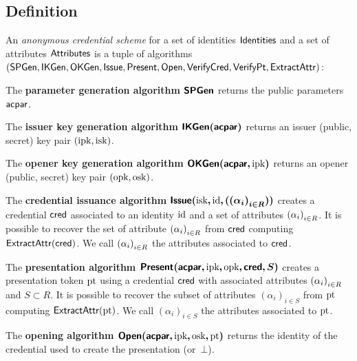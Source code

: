 \subsection{Definition}\label{sec:AC:definition}


An \textit{anonymous credential scheme} for a set of identities $\mathsf{Identities}$ and 
a set of attributes $\mathsf{Attributes}$ is a tuple of algorithms $(\mathsf{SPGen}, 
\mathsf{IKGen},\allowbreak \mathsf{OKGen}, \mathsf{Issue}, \mathsf{Present}, \mathsf{Open}, 
\mathsf{VerifyCred},\allowbreak \mathsf{VerifyPt}, \mathsf{ExtractAttr})$:

\begin{compactitem} 
\item The \textbf{parameter generation algorithm $\bm{\mathsf{SPGen}}$}
	returns the public parameters $\mathsf{acpar}$.

\item The \textbf{issuer key generation algorithm $\bm{\mathsf{IKGen}(\mathsf{acpar})}$}
returns an issuer (public, secret) key pair $(\text{ipk}, \text{isk})$.

\item The \textbf{opener key generation algorithm $\bm{\mathsf{OKGen}(\mathsf{acpar}, \text{ipk})}$}
returns an opener (public, secret) key pair $(\text{opk}, \text{osk})$.

\item The \textbf{credential issuance algorithm $\bm{\mathsf{Issue}(\text{isk}, \text{id}, 
({(\alpha_i)}_{i\in R}))}$} creates a credential $\mathsf{cred}$ associated to an identity 
$\text{id}$ and a set of attributes ${(\alpha_i)}_{i\in R}$. It is possible to recover 
the set of attribute ${(\alpha_i)}_{i\in R}$ from $\mathsf{cred}$ computing 
$\mathsf{ExtractAttr}(\mathsf{cred})$. We call ${(\alpha_i)}_{i\in R}$ the attributes associated to 
$\mathsf{cred}$.

\item The \textbf{presentation algorithm $\bm{\mathsf{Present}(\mathsf{acpar}, \text{ipk}, \text{opk}, \mathsf{cred}, S)}$} creates a presentation token $\text{pt}$ using a credential $\mathsf{cred}$ with associated attributes ${(\alpha_i)}_{i\in R}$ and $S \subset R$. It is 
	possible to recover the subset of attributes $(\alpha_i)_{i \in S}$ from $\text{pt}$ computing 
$\mathsf{ExtractAttr}(\text{pt})$. We call $(\alpha_i)_{i \in S}$ the attributes associated to $\text{pt}$.

\item The \textbf{opening algorithm $\bm{\mathsf{Open}(\mathsf{acpar}, \text{ipk}, \text{osk}, \text{pt})}$} returns the 
identity of the credential used to create the presentation (or~$\bot$).


\end{compactitem}

